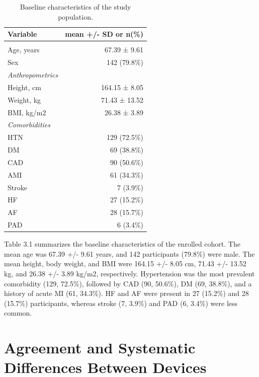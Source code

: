 \documentclass[
  12pt,
  letterpaper,
  openany,
  oneside]{book}
\begin{document}
\begin{table}
\caption{Baseline characteristics of the study population.}\tabularnewline

\fontsize{12.0pt}{14.0pt}\selectfont
\begin{tabular*}{\linewidth}{@{\extracolsep{\fill}}lr}
\toprule
{\bfseries Variable} & {\bfseries mean +/- SD or n(\%)} \\ 
\midrule\addlinespace[2.5pt]
{\itshape Demographics} &  \\ 
Age, years & 67.39 ± 9.61 \\ 
Sex & 142 (79.8\%) \\ 
{\itshape Anthropometrics} &  \\ 
Height, cm & 164.15 ± 8.05 \\ 
Weight, kg & 71.43 ± 13.52 \\ 
BMI, kg/m2 & 26.38 ± 3.89 \\ 
{\itshape Comorbidities} &  \\ 
HTN & 129 (72.5\%) \\ 
DM & 69 (38.8\%) \\ 
CAD & 90 (50.6\%) \\ 
AMI & 61 (34.3\%) \\ 
Stroke & 7 (3.9\%) \\ 
HF & 27 (15.2\%) \\ 
AF & 28 (15.7\%) \\ 
PAD & 6 (3.4\%) \\ 
\bottomrule
\end{tabular*}
\end{table}

Table 3.1 summarizes the baseline characteristics of the enrolled
cohort. The mean age was 67.39 +/- 9.61 years, and 142 participants
(79.8\%) were male. The mean height, body weight, and BMI were 164.15
+/- 8.05 cm, 71.43 +/- 13.52 kg, and 26.38 +/- 3.89 kg/m2, respectively.
Hypertension was the most prevalent comorbidity (129, 72.5\%), followed
by CAD (90, 50.6\%), DM (69, 38.8\%), and a history of acute MI (61,
34.3\%). HF and AF were present in 27 (15.2\%) and 28 (15.7\%)
participants, whereas stroke (7, 3.9\%) and PAD (6, 3.4\%) were less
common.

\clearpage

\section{Agreement and Systematic Differences Between
Devices}\label{agreement-and-systematic-differences-between-devices}
\end{document}
